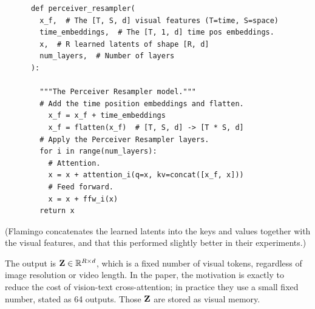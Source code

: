 \documentclass[11pt]{article}  %
\begin{document}
\begin{itemize}
\begin{enumerate}
    \begin{lstlisting}
      def perceiver_resampler(
        x_f,  # The [T, S, d] visual features (T=time, S=space)
        time_embeddings,  # The [T, 1, d] time pos embeddings.
        x,  # R learned latents of shape [R, d]
        num_layers,  # Number of layers
      ):
  
        """The Perceiver Resampler model."""
        # Add the time position embeddings and flatten.
          x_f = x_f + time_embeddings
          x_f = flatten(x_f)  # [T, S, d] -> [T * S, d]
        # Apply the Perceiver Resampler layers.
        for i in range(num_layers):
          # Attention.
          x = x + attention_i(q=x, kv=concat([x_f, x]))
          # Feed forward.
          x = x + ffw_i(x)
        return x
    \end{lstlisting}
    (Flamingo concatenates the learned latents into the keys and values together with the visual features, and that this performed slightly better in their experiments.)

    The output is $\mathbf{Z} \in \mathbb{R}^{R \times d}$, which is a fixed number of visual tokens, regardless of image resolution or video length.
    In the paper, the motivation is exactly to reduce the cost of vision-text cross-attention; in practice they use a small fixed number, stated as 64 outputs.
    Those $\mathbf{Z}$ are stored as visual memory.


\end{enumerate}
\end{itemize}
\end{document}
